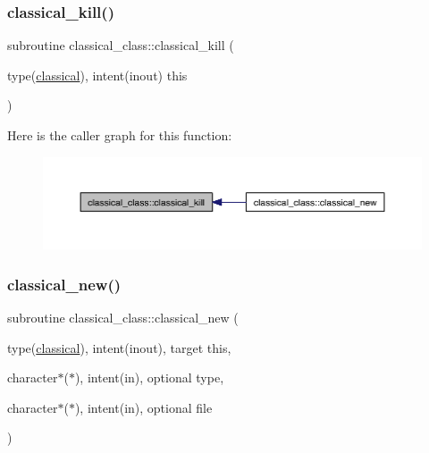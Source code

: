 \mbox{\label{namespaceclassical__class_a88946a9bda2bac6d08860b7d96cf5219}} 
\subsubsection{\texorpdfstring{classical\+\_\+kill()}{classical\_kill()}}
{\footnotesize\ttfamily subroutine classical\+\_\+class\+::classical\+\_\+kill (\begin{DoxyParamCaption}\item[{type(\hyperlink{structclassical__class_1_1classical}{classical}), intent(inout)}]{this }\end{DoxyParamCaption})\hspace{0.3cm}{\ttfamily [private]}}

Here is the caller graph for this function\+:\nopagebreak
\begin{figure}[H]
\begin{center}
\leavevmode
\includegraphics[width=350pt]{namespaceclassical__class_a88946a9bda2bac6d08860b7d96cf5219_icgraph}
\end{center}
\end{figure}
\mbox{\label{namespaceclassical__class_a6e5dda0e17a3e5cb552a289231d488fd}} 
\subsubsection{\texorpdfstring{classical\+\_\+new()}{classical\_new()}}
{\footnotesize\ttfamily subroutine classical\+\_\+class\+::classical\+\_\+new (\begin{DoxyParamCaption}\item[{type(\hyperlink{structclassical__class_1_1classical}{classical}), intent(inout), target}]{this,  }\item[{character$\ast$($\ast$), intent(in), optional}]{type,  }\item[{character$\ast$($\ast$), intent(in), optional}]{file }\end{DoxyParamCaption})\hspace{0.3cm}{\ttfamily [private]}}

